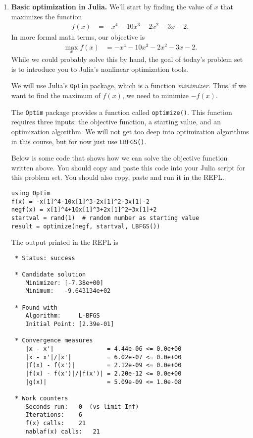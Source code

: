 \documentclass[12pt,english]{article}
\begin{document}
\begin{enumerate}
\item \textbf{Basic optimization in Julia.} We'll start by finding the value of $x$ that maximizes the function \begin{align*}f(x) &= -x^4-10x^3-2x^2-3x-2.\end{align*}
In more formal math terms, our objective is\begin{align*} \max_x f(x) &= -x^4-10x^3-2x^2-3x-2.\end{align*}
While we could probably solve this by hand, the goal of today's problem set is to introduce you to Julia's nonlinear optimization tools.

We will use Julia's \texttt{Optim} package, which is a function \textit{minimizer}. Thus, if we want to find the maximum of $f(x)$, we need to minimize $-f(x)$.

The \texttt{Optim} package provides a function called \texttt{optimize()}. This function requires three inputs: the objective function, a starting value, and an optimization algorithm. We will not get too deep into optimization algorithms in this course, but for now just use \texttt{LBFGS()}.

Below is some code that shows how we can solve the objective function written above. You should copy and paste this code into your Julia script for this problem set. You should also copy, paste and run it in the REPL.

\begin{verbatim}
using Optim
f(x) = -x[1]^4-10x[1]^3-2x[1]^2-3x[1]-2
negf(x) = x[1]^4+10x[1]^3+2x[1]^2+3x[1]+2
startval = rand(1)  # random number as starting value
result = optimize(negf, startval, LBFGS())
\end{verbatim}

The output printed in the REPL is
\begin{verbatim}
 * Status: success

 * Candidate solution
    Minimizer: [-7.38e+00]
    Minimum:   -9.643134e+02

 * Found with
    Algorithm:     L-BFGS
    Initial Point: [2.39e-01]

 * Convergence measures
    |x - x'|               = 4.44e-06 <= 0.0e+00
    |x - x'|/|x'|          = 6.02e-07 <= 0.0e+00
    |f(x) - f(x')|         = 2.12e-09 <= 0.0e+00
    |f(x) - f(x')|/|f(x')| = 2.20e-12 <= 0.0e+00
    |g(x)|                 = 5.09e-09 <= 1.0e-08

 * Work counters
    Seconds run:   0  (vs limit Inf)
    Iterations:    6
    f(x) calls:    21
    nablaf(x) calls:   21
\end{verbatim}


\end{enumerate}
\end{document}
